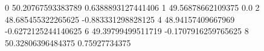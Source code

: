 0 50.20767593383789 0.6388893127441406
1 49.56878662109375 0.0
2 48.685455322265625 -0.883331298828125
4 48.94157409667969 -0.6272125244140625
6 49.39799499511719 -0.1707916259765625
8 50.32806396484375 0.75927734375
